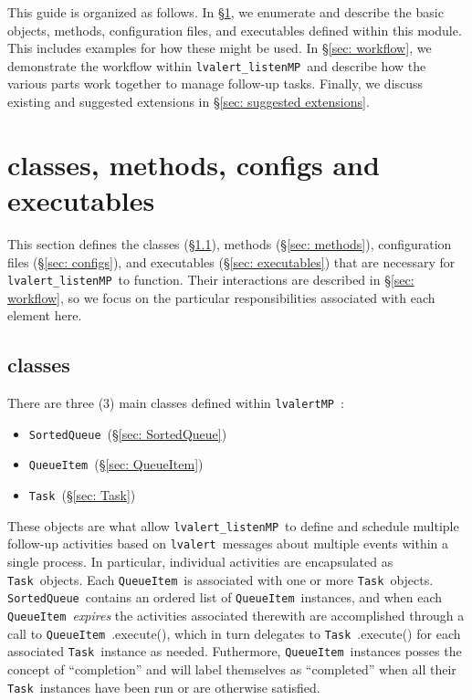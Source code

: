 \documentclass{article}
\newcommand{\alert}{\texttt{lvalert}~}
\newcommand{\lvalertMP}{\texttt{lvalertMP}~}
\newcommand{\lvalertListenMP}{\texttt{lvalert\_listenMP}~}
\newcommand{\SortedQueue}{\texttt{SortedQueue}~}
\newcommand{\QueueItem}{\texttt{QueueItem}~}
\newcommand{\Task}{\texttt{Task}~}
\begin{document}
This guide is organized as follows. In \S\ref{sec: classes, methods, configs and executables}, we enumerate and describe the basic objects, methods, configuration files, and executables defined within this module. 
This includes examples for how these might be used.
In \S\ref{sec: workflow}, we demonstrate the workflow within \lvalertListenMP and describe how the various parts work together to manage follow-up tasks.
Finally, we discuss existing and suggested extensions in \S\ref{sec: suggested extensions}.


\section{classes, methods, configs and executables}
\label{sec: classes, methods, configs and executables}

This section defines the classes (\S\ref{sec: classes}), methods (\S\ref{sec: methods}), configuration files (\S\ref{sec: configs}), and executables (\S\ref{sec: executables}) that are necessary for \lvalertListenMP to function. 
Their interactions are described in \S\ref{sec: workflow}, so we focus on the particular responsibilities associated with each element here.


\subsection{classes}
\label{sec: classes}

There are three (3) main classes defined within \lvalertMP:
\begin{itemize}
    \item{\SortedQueue (\S\ref{sec: SortedQueue})}
    \item{\QueueItem (\S\ref{sec: QueueItem})}
    \item{\Task (\S\ref{sec: Task})}
\end{itemize}
These objects are what allow \lvalertListenMP to define and schedule multiple follow-up activities based on \alert messages about multiple events within a single process.
In particular, individual activities are encapsulated as \Task objects.
Each \QueueItem is associated with one or more \Task objects.
\SortedQueue contains an ordered list of \QueueItem instances, and when each \QueueItem \textit{expires} the activities associated therewith are accomplished through a call to \QueueItem.execute(), which in turn delegates to \Task.execute() for each associated \Task instance as needed.
Futhermore, \QueueItem instances posses the concept of ``completion'' and will label themselves as ``completed'' when all their \Task instances have been run or are otherwise satisfied.
\end{document}
